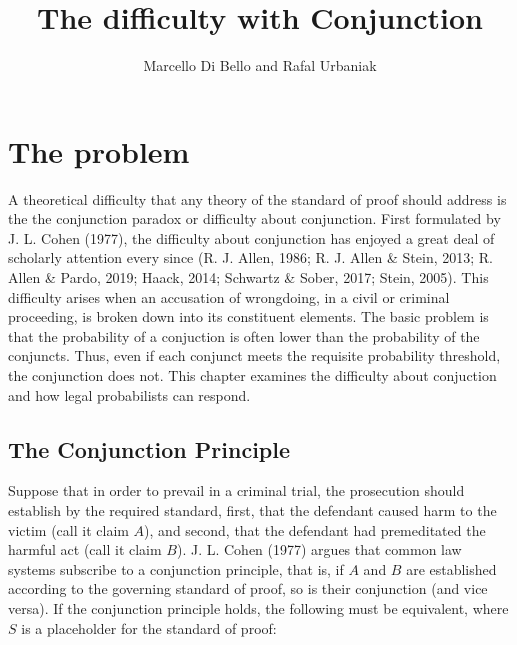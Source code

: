 \documentclass[
  10pt,
  dvipsnames,enabledeprecatedfontcommands]{scrartcl}
\title{The difficulty with Conjunction}
\author{Marcello Di Bello and Rafal Urbaniak}
\date{}
\begin{document}
\maketitle

\tableofcontents

\hypertarget{the-problem}{%
\section{The problem}\label{the-problem}}

A theoretical difficulty that any theory
of the standard of proof should address is the the conjunction paradox
or difficulty about conjunction. First formulated by J. L. Cohen (1977),
the difficulty about conjunction has enjoyed a great deal of scholarly
attention every since (R. J. Allen, 1986; R. J. Allen \& Stein, 2013; R.
Allen \& Pardo, 2019; Haack, 2014; Schwartz \& Sober, 2017; Stein,
2005). This difficulty arises when an accusation of wrongdoing, in a
civil or criminal proceeding, is broken down into its constituent
elements. The basic problem is that the probability of a conjuction is
often lower than the probability of the conjuncts. Thus, even if each
conjunct meets the requisite probability threshold, the conjunction does
not. This chapter examines the difficulty about conjuction and how legal
probabilists can respond.

\hypertarget{the-conjunction-principle}{%
\subsection{The Conjunction Principle}\label{the-conjunction-principle}}

Suppose that in order to prevail in a criminal trial, the prosecution
should establish by the required standard, first, that the defendant
caused harm to the victim (call it claim \(A\)), and second, that the
defendant had premeditated the harmful act (call it claim \(B\)). J. L.
Cohen (1977) argues that common law systems subscribe to a conjunction
principle, that
is,
if \(A\) and \(B\) are established according to the governing standard
of proof, so is their conjunction (and vice versa). If the conjunction
principle holds, the following must be equivalent, where \(S\) is a
placeholder for the standard of proof:
\end{document}
